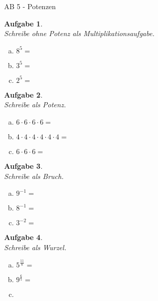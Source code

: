 \documentclass[12pt,fleqn]{article}
\theoremstyle{aufg}
\newtheorem{aufgabe}{Aufgabe}
\theoremstyle{bsp}
\begin{document}
 
    \begin{flushleft}
\begin{center}AB 5 - Potenzen\end{center}\begin{aufgabe} ~ \\ 
Schreibe ohne Potenz als Multiplikationsaufgabe. \\ 
\begin{multicols}{3} 
\begin{enumerate}[a)] 
\item 
$8^{5}=$
\item 
$3^{5}=$
\item 
$2^{5}=$
\end{enumerate} 
\end{multicols} 
\end{aufgabe} 
\begin{aufgabe} ~ \\ 
Schreibe als Potenz. \\ 
\begin{multicols}{3} 
\begin{enumerate}[a)] 
\item 
$6\cdot6\cdot6\cdot6=$
\item 
$4\cdot4\cdot4\cdot4\cdot4\cdot4=$
\item 
$6\cdot6\cdot6=$
\end{enumerate} 
\end{multicols} 
\end{aufgabe} 
\begin{aufgabe} ~ \\ 
Schreibe als Bruch. \\ 
\begin{multicols}{3} 
\begin{enumerate}[a)] 
\item 
$9^{-1}=$
\item 
$8^{-1}=$
\item 
$3^{-2}=$
\end{enumerate} 
\end{multicols} 
\end{aufgabe} 
\begin{aufgabe} ~ \\ 
Schreibe als Wurzel. \\ 
\begin{multicols}{3} 
\begin{enumerate}[a)] 
\item 
$5^{\frac{11}{8}}=$
\item 
$9^{\frac{6}{5}}=$
\item 

\end{enumerate}
\end{multicols}
\end{aufgabe}
\end{flushleft}
\end{document}
